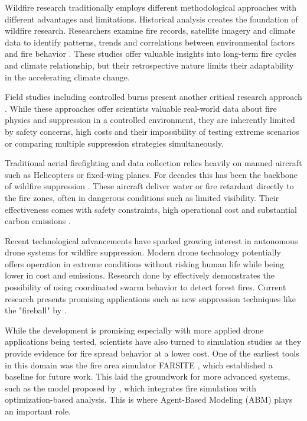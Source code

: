 \documentclass[twoside]{article}
\begin{document}
Wildfire research traditionally employs different methodological approaches with different advantages and limitations. Historical analysis creates the foundation of wildfire research. Researchers examine fire records, satellite imagery and climate data to identify patterns, trends and correlations between environmental factors and fire behavior \citep{copernicus-wildfires,IPCC2023}. These studies offer valuable insights into long-term fire cycles and climate relationship, but their retrospective nature limits their adaptability in the accelerating climate change. 

Field studies including controlled burns present another critical research approach \citep{wildland}. While these approaches offer scientists valuable real-world data about fire physics and suppression in a controlled environment, they are inherently limited by safety concerns, high costs and their impossibility of testing extreme scenarios or comparing multiple suppression strategies simultaneously.

Traditional aerial firefighting and data collection relies heavily on manned aircraft such as Helicopters or fixed-wing planes. For decades this has been the backbone of wildfire suppression \citep{janney2012airtankers}. These aircraft deliver water or fire retardant directly to the fire zones, often in dangerous conditions such as limited visibility. Their effectiveness comes with safety constraints, high operational cost and substantial carbon emissions \citep{spicerRapidMeasurementEmissions2009}.

Recent technological advancements have sparked growing interest in autonomous drone systems for wildfire suppression. Modern drone technology potentially offers operation in extreme conditions without risking human life while being lower in cost and emissions. Research done by \citet{Yan2024} effectively demonstrates the possibility of using coordinated swarm behavior to detect forest fires. Current research presents promising applications such as new suppression techniques like the "fireball" by \citet{fireBalls}.

While the development is promising especially with more applied drone applications being tested, scientists have also turned to simulation studies as they provide evidence for fire spread behavior at a lower cost. One of the earliest tools in this domain was the fire area simulator FARSITE \citep{FARSITE}, which established a baseline for future work. This laid the groundwork for more advanced systems, such as the model proposed by \citet{integrated_simulation}, which integrates fire simulation with optimization-based analysis.
This is where Agent-Based Modeling (ABM) plays an important role.
\end{document}
